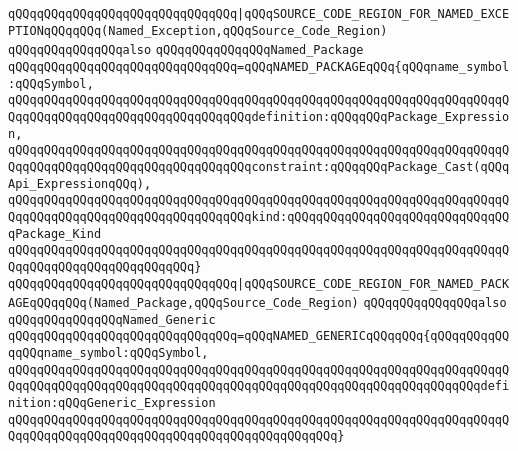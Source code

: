 \verb|qQQqqQQqqQQqqQQqqQQqqQQqqQQqqQQq|\verb#|qQQqSOURCE_CODE_REGION_FOR_NAMED_EXCEPTIONqQQqqQQq(Named_Exception,qQQqSource_Code_Region)#\newline
\newline
\newline
\newline
\verb|qQQqqQQqqQQqqQQqalso|\newline
\verb|qQQqqQQqqQQqqQQqNamed_Package|\newline
\newline
\verb|qQQqqQQqqQQqqQQqqQQqqQQqqQQqqQQq=qQQqNAMED_PACKAGEqQQq{qQQqname_symbol:qQQqSymbol,|\newline
\verb|qQQqqQQqqQQqqQQqqQQqqQQqqQQqqQQqqQQqqQQqqQQqqQQqqQQqqQQqqQQqqQQqqQQqqQQqqQQqqQQqqQQqqQQqqQQqqQQqqQQqqQQqdefinition:qQQqqQQqPackage_Expression,|\newline
\verb|qQQqqQQqqQQqqQQqqQQqqQQqqQQqqQQqqQQqqQQqqQQqqQQqqQQqqQQqqQQqqQQqqQQqqQQqqQQqqQQqqQQqqQQqqQQqqQQqqQQqqQQqconstraint:qQQqqQQqPackage_Cast(qQQqApi_ExpressionqQQq),|\newline
\verb|qQQqqQQqqQQqqQQqqQQqqQQqqQQqqQQqqQQqqQQqqQQqqQQqqQQqqQQqqQQqqQQqqQQqqQQqqQQqqQQqqQQqqQQqqQQqqQQqqQQqqQQqkind:qQQqqQQqqQQqqQQqqQQqqQQqqQQqqQQqPackage_Kind|\newline
\verb|qQQqqQQqqQQqqQQqqQQqqQQqqQQqqQQqqQQqqQQqqQQqqQQqqQQqqQQqqQQqqQQqqQQqqQQqqQQqqQQqqQQqqQQqqQQqqQQq}|\newline
\newline
\verb|qQQqqQQqqQQqqQQqqQQqqQQqqQQqqQQq|\verb#|qQQqSOURCE_CODE_REGION_FOR_NAMED_PACKAGEqQQqqQQq(Named_Package,qQQqSource_Code_Region)#\newline
\newline
\newline
\newline
\verb|qQQqqQQqqQQqqQQqalso|\newline
\verb|qQQqqQQqqQQqqQQqNamed_Generic|\newline
\newline
\verb|qQQqqQQqqQQqqQQqqQQqqQQqqQQqqQQq=qQQqNAMED_GENERICqQQqqQQq{qQQqqQQqqQQqqQQqname_symbol:qQQqSymbol,|\newline
\verb|qQQqqQQqqQQqqQQqqQQqqQQqqQQqqQQqqQQqqQQqqQQqqQQqqQQqqQQqqQQqqQQqqQQqqQQqqQQqqQQqqQQqqQQqqQQqqQQqqQQqqQQqqQQqqQQqqQQqqQQqqQQqqQQqqQQqqQQqdefinition:qQQqGeneric_Expression|\newline
\verb|qQQqqQQqqQQqqQQqqQQqqQQqqQQqqQQqqQQqqQQqqQQqqQQqqQQqqQQqqQQqqQQqqQQqqQQqqQQqqQQqqQQqqQQqqQQqqQQqqQQqqQQqqQQqqQQqqQQq}|\newline
\newline
